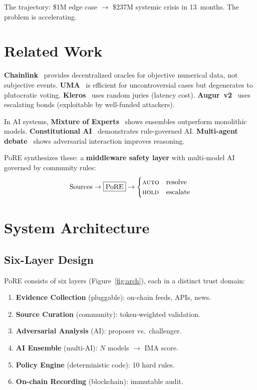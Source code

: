 \documentclass[11pt,a4paper,twocolumn]{article}
\begin{document}
The trajectory: \$1M edge case $\to$ \$237M systemic crisis in 13~months. The problem is accelerating.

\section{Related Work}

\textbf{Chainlink}~\cite{chainlink2021} provides decentralized oracles for objective numerical data, not subjective events. \textbf{UMA}~\cite{uma2020} is efficient for uncontroversial cases but degenerates to plutocratic voting. \textbf{Kleros}~\cite{kleros2017} uses random juries (latency cost). \textbf{Augur~v2}~\cite{augur2015} uses escalating bonds (exploitable by well-funded attackers).

In AI systems, \textbf{Mixture of Experts}~\cite{shazeer2017} shows ensembles outperform monolithic models. \textbf{Constitutional AI}~\cite{bai2022} demonstrates rule-governed AI. \textbf{Multi-agent debate}~\cite{liang2023} shows adversarial interaction improves reasoning.

PoRE synthesizes these: a \textbf{middleware safety layer} with multi-model AI governed by community rules:
\[
\text{Sources} \to \boxed{\text{PoRE}} \to
\begin{cases}
\textsc{auto} & \text{resolve} \\
\textsc{hold} & \text{escalate}
\end{cases}
\]

\section{System Architecture}

\subsection{Six-Layer Design}

PoRE consists of six layers (Figure~\ref{fig:arch}), each in a distinct trust domain:

\begin{enumerate}[nosep,leftmargin=*]
    \item \textbf{Evidence Collection} (pluggable): on-chain feeds, APIs, news.
    \item \textbf{Source Curation} (community): token-weighted validation.
    \item \textbf{Adversarial Analysis} (AI): proposer vs.\ challenger.
    \item \textbf{AI Ensemble} (multi-AI): $N$ models $\to$ IMA score.
    \item \textbf{Policy Engine} (deterministic code): 10 hard rules.
    \item \textbf{On-chain Recording} (blockchain): immutable audit.
\end{enumerate}
\end{document}
